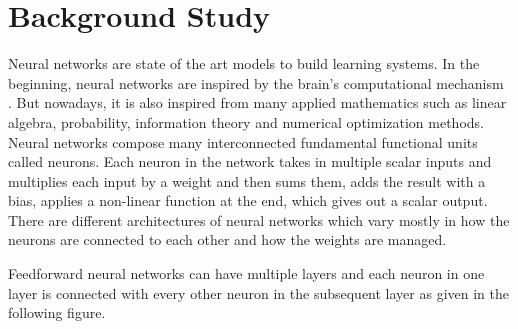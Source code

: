 \documentclass[a4paper, 11pt]{article}
\begin{document}
  





\section{Background Study}

Neural networks are state of the art models to build learning systems. In the beginning, neural networks are inspired by the brain's computational mechanism \cite{McCulloch1943}. But nowadays, it is also inspired from many applied mathematics such as linear algebra, probability, information theory and numerical optimization methods\cite{Goodfellow2016}. Neural networks compose many interconnected fundamental functional units called neurons. Each neuron in the network takes in multiple scalar inputs and multiplies each input by a weight and then sums them, adds the result with a bias, applies a non-linear function at the end, which gives out a scalar output. There are different architectures of neural networks which vary mostly in how the neurons are connected to each other and how the weights are managed. 

Feedforward neural networks \cite{Svozil1997} can have multiple layers and each neuron in one layer is connected with every other neuron in the subsequent layer as given in the following figure. 
\end{document}
